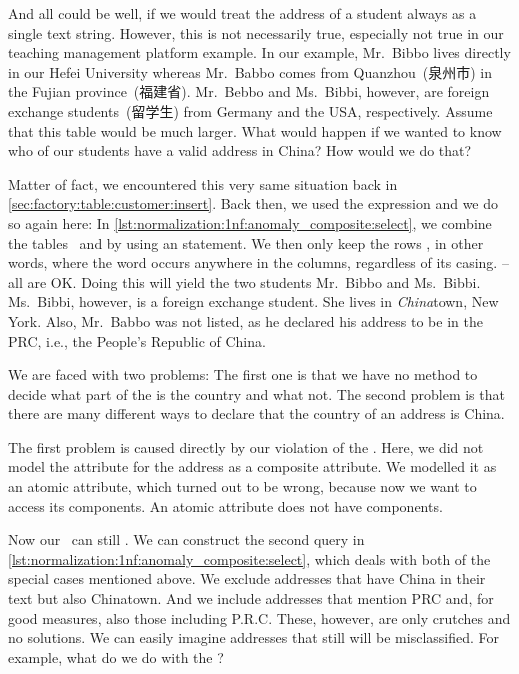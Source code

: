 And all could be well, if we would treat the address of a student always as a single text string.
However, this is not necessarily true, especially not true in our teaching management platform example.
In our example, Mr.~Bibbo lives directly in our Hefei University whereas Mr.~Babbo comes from Quanzhou~(泉州市) in the Fujian province~(福建省).
Mr.~Bebbo and Ms.~Bibbi, however, are foreign exchange students~(留学生) from Germany and the USA, respectively.
Assume that this table would be much larger.
What would happen if we wanted to know who of our students have a valid address in China?
How would we do that?%
%
\begin{sloppypar}%
Matter of fact, we encountered this very same situation back in \cref{sec:factory:table:customer:insert}.
Back then, we used the  expression and we do so again here:
In \cref{lst:normalization:1nf:anomaly_composite:select}, we combine the tables~ and  by using an  statement.
We then only keep the rows , in other words, where the word  occurs anywhere in the  columns, regardless of its casing.
    -- all are OK.
Doing this will yield the two students Mr.~Bibbo and Ms.~Bibbi.
Ms.~Bibbi, however, is a foreign exchange student.
She lives in \emph{China}town, New York.
Also, Mr.~Babbo was not listed, as he declared his address to be in the PRC, i.e., the People's Republic of China.%
\end{sloppypar}%
%
We are faced with two problems:
The first one is that we have no method to decide what part of the  is the country and what not.
The second problem is that there are many different ways to declare that the country of an address is China.

The first problem is caused directly by our violation of the .
Here, we did not model the attribute for the address as a composite attribute.
We modelled it as an atomic attribute, which turned out to be wrong, because now we want to access its components.
An atomic attribute does not have components.

Now our \db\ can still .
We can construct the second query in \cref{lst:normalization:1nf:anomaly_composite:select}, which deals with both of the special cases mentioned above.
We exclude addresses that have China in their text but also Chinatown.
And we include addresses that mention PRC and, for good measures, also those including P.R.C.
These, however, are only crutches and no solutions.
We can easily imagine addresses that still will be misclassified.
For example, what do we do with the ?


